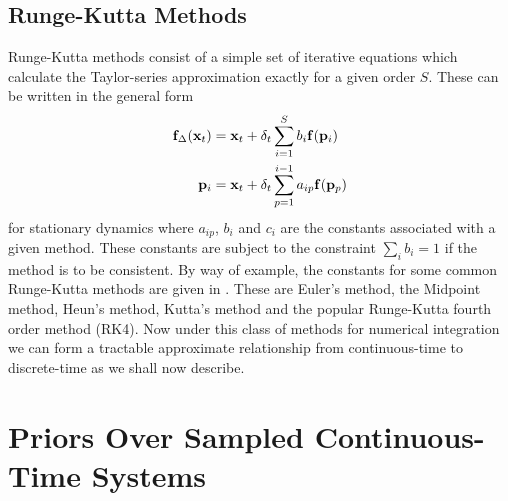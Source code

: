 \subsection{Runge-Kutta Methods}
Runge-Kutta methods consist of a simple set of iterative equations which calculate the Taylor-series approximation exactly for a given order $S$. These can be written in the general form
\begin{align}
\mathbf{f}_{\Delta}(\mathbf{x}_t) &= \mathbf{x}_t + \delta_t \sum_{i=1}^{S}b_i \mathbf{f}( \mathbf{p}_i) \label{eqn:RK1}
\\
\mathbf{p}_i &= \mathbf{x}_t + \delta_t \sum_{p=1}^{i-1} a_{ip} \mathbf{f}( \mathbf{p}_p ) \label{eqn:RK2}
\end{align}
for stationary dynamics where $a_{ip}$, $b_i$ and $c_i$ are the constants associated with a given method. These constants are subject to the constraint $\sum_i b_i = 1$ if the method is to be consistent. By way of example, the constants for some common Runge-Kutta methods are given in . These are Euler's method, the Midpoint method, Heun's method, Kutta's method and the popular Runge-Kutta fourth order method (RK4). 
Now under this class of methods for numerical integration we can form a tractable approximate relationship from continuous-time to discrete-time as we shall now describe. 




\section{Priors Over Sampled Continuous-Time Systems} \label{sec:priorovercont}


